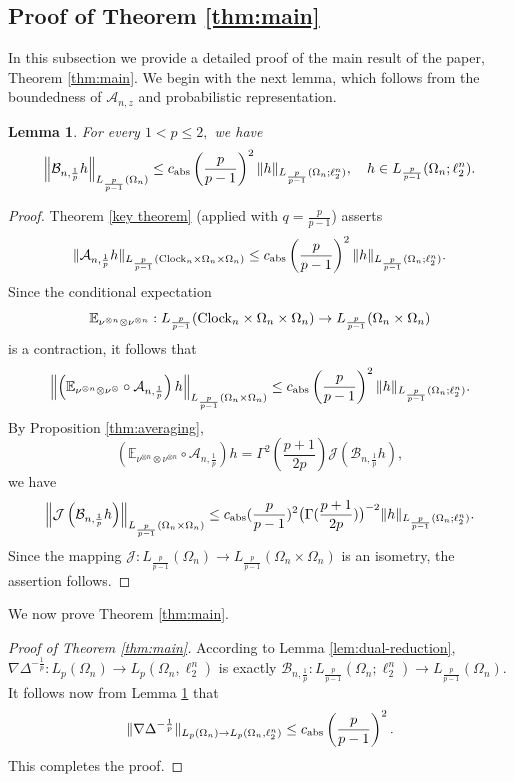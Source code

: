 \documentclass{amsart}
\numberwithin{equation}{section}
\newtheorem{lem}[thm]{Lemma}
\theoremstyle{definition}
\theoremstyle{remark}
\newcommand{\1}{\mathbf 1}
\begin{document}
\subsection{Proof of Theorem \ref{thm:main}} In this subsection we provide a detailed proof of the main result of the paper, Theorem \ref{thm:main}. We begin with the next lemma, which follows from the boundedness of $\mathcal{A}_{n,z}$ and probabilistic representation.
\begin{lem}\label{b boundedness lemma} For every $1<p\leq 2,$ we have
$$\left\|\mathcal{B}_{n,\frac{1}{p}}h\right\|_{L_{\frac{p}{p-1}}(\Omega_n)}\leq c_{{\rm abs}}\left(\frac{p}{p-1}\right)^2\|h\|_{L_{\frac{p}{p-1}}(\Omega_n;\ell^{n}_{2})},\quad h\in L_{\frac{p}{p-1}}(\Omega_n;\ell^{n}_{2}).$$
\end{lem}
\begin{proof}
Theorem \ref{key theorem} (applied with $q=\frac{p}{p-1}$) asserts
$$\|\mathcal{A}_{n,\frac1p}h\|_{L_\frac{p}{p-1}({\rm Clock}_n\times\Omega_n\times\Omega_n)}\leq c_{{\rm abs}}\left(\frac{p}{p-1}\right)^2\|h\|_{L_{\frac{p}{p-1}}(\Omega_n;\ell^{n}_{2})}.$$
Since the conditional expectation
$$\mathbb{E}_{\nu^{\otimes n}\otimes \nu^{\otimes n}}:L_\frac{p}{p-1}({\rm Clock}_n\times\Omega_n\times\Omega_n)\to L_{\frac{p}{p-1}}(\Omega_n\times\Omega_n)$$
is a contraction, it follows that
$$
\left\|\left(\mathbb{E}_{\nu^{\otimes n}\otimes \nu^{\otimes}}\circ\mathcal{A}_{n,\frac1p}\right)h\right\|_{L_{\frac{p}{p-1}}(\Omega_n\times\Omega_n)}\leq c_{{\rm abs}}\left(\frac{p}{p-1}\right)^2\|h\|_{L_{\frac{p}{p-1}}(\Omega_n;\ell^{n}_{2})}.
$$
By Proposition \ref{thm:averaging},
$$\left(\mathbb{E}_{\nu^{\otimes n}\otimes \nu^{\otimes n}}\circ\mathcal{A}_{n,\frac1p}\right)h=\Gamma^2\left(\frac{p+1}{2p}\right)\mathcal{J}\left(\mathcal{B}_{n,\frac1p}h\right),$$
we have
$$
\left\|\mathcal{J}\left(\mathcal{B}_{n,\frac1p}h\right)\right\|_{L_{\frac{p}{p-1}}(\Omega_n\times\Omega_n)}\leq c_{{\rm abs}}(\frac{p}{p-1})^2\big(\Gamma(\frac{p+1}{2p})\big)^{-2}\|h\|_{L_{\frac{p}{p-1}}(\Omega_n;\ell^{n}_{2})}.
$$
Since the mapping $\mathcal{J}:L_{\frac{p}{p-1}}(\Omega_n)\to L_{\frac{p}{p-1}}(\Omega_n\times\Omega_n)$ is an isometry, the assertion follows.
\end{proof}

We now prove Theorem \ref{thm:main}. 

\begin{proof}[Proof of Theorem \ref{thm:main}] According to Lemma \ref{lem:dual-reduction}, $\nabla\Delta^{-\frac1p}:L_p(\Omega_n)\to L_p(\Omega_n,\ell^{n}_{2})$ is exactly $\mathcal{B}_{n,\frac1p}:L_{\frac{p}{p-1}}(\Omega_n;\ell^{n}_{2})\to L_{\frac{p}{p-1}}(\Omega_n).$ It follows now from Lemma \ref{b boundedness lemma} that
$$
\|\nabla\Delta^{-\frac1p}\|_{L_p(\Omega_n)\to L_p(\Omega_n,\ell^{n}_{2})}\leq c_{{\rm abs}}\left(\frac{p}{p-1}\right)^{2}.
$$
This completes the proof.
\end{proof}
\end{document}
